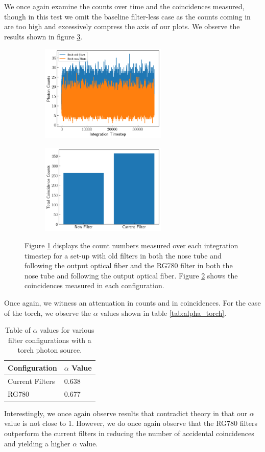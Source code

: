 \documentclass[letterpaper, 11 pt]{book}
\begin{document}
We once again examine the counts over time and the coincidences measured, though in this test
we omit the baseline filter-less case as the counts coming in are too high and excessively compress
the axis of our plots. We observe the results shown in figure \ref{fig:torch_filters}.
\begin{figure}[H]%
    \centering
    \begin{subfigure}{.4\textwidth}
    \includegraphics[width=6cm]{filter_ch1_torch.png}
    \caption{ }
    \label{fig:tch1}
    \end{subfigure}
    \begin{subfigure}{.4\textwidth}
    \includegraphics[width = 6cm]{filter_cc_torc.png}
    \caption{ }
    \label{fig:tcc}
    \end{subfigure}
    \caption{Figure \ref{fig:tch1} displays the count numbers measured over each
    integration timestep for a set-up with old filters in both the
    nose tube and following the output optical fiber and the RG780 filter in
    both the nose tube and following the output optical fiber. Figure
    \ref{fig:tcc} shows the coincidences measured in each configuration.}
    \label{fig:torch_filters}
\end{figure}
Once again, we witness an attenuation in counts and in coincidences. For the case of the
torch, we observe the $\alpha$ values shown in table \ref{tab:alpha_torch}.
\begin{table}[H]
    \centering
    \begin{tabular}{|l|l|}
    \hline
    \textbf{Configuration} & \textbf{$\alpha$ Value} \\ \hline
    Current Filters        & 0.638                   \\ \hline
    RG780                  & 0.677                   \\ \hline
    \end{tabular}
    \caption{Table of $\alpha$ values for various filter configurations with a torch photon source.}
\end{table}\label{tab:alpha_torch}
Interestingly, we once again observe results that contradict theory in that our $\alpha$ value
is not close to 1. However, we do once again observe that the RG780 filters outperform the current filters
in reducing the number of accidental coincidences and yielding a higher $\alpha$ value.
\end{document}
